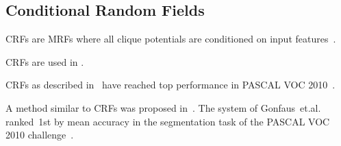 









\subsection{Conditional Random Fields}\label{subsec:conditional-random-fields}

\Glspl{CRF} are \glspl{MRF} where all clique potentials are conditioned on
input features~\cite{murphy2012machine}. %

\Glspl{CRF} are used in \cite{multiscale04,shotton2006textonboost}.

\Glspl{CRF} as described in~\cite{associative09} have reached top performance
in PASCAL VOC 2010~\cite{VOC2010Results}.


A method similar to \glspl{CRF} was proposed in~\cite{gonfaus2010harmony}.
The system of Gonfaus~et.al. ranked~1st by mean accuracy in the segmentation
task of the PASCAL VOC 2010 challenge~\cite{everingham2010pascal}.
